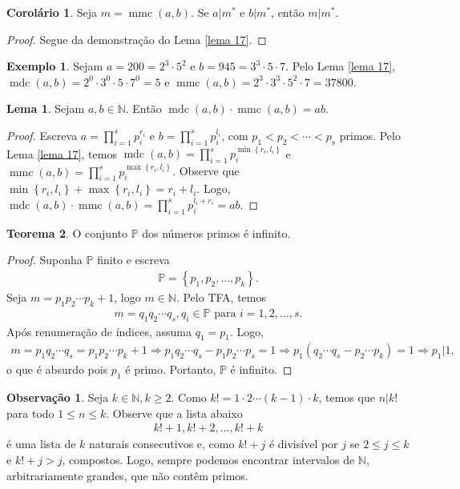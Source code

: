 \documentclass[a4paper,11pt,twoside, leqno]{article}
\DeclareMathOperator{\mdc}{mdc}
\DeclareMathOperator{\mmc}{mmc}
\theoremstyle{definition}
\newtheorem{theorem}{Teorema}[section]
\newtheorem{corollary}{Corolário}[theorem]
\newtheorem{lemma}[theorem]{Lema}
\newtheorem{remark}{Observação}[section]
\newtheorem*{example}{Exemplo}
\begin{document}
\begin{corollary}
	Seja $m = \mmc(a,b)$. Se $a|m^\ast$ e $b|m^\ast$, então $m|m^\ast$.
\end{corollary}
\begin{proof}
	Segue da demonstração do Lema \eqref{lema 17}.
\end{proof}
\begin{example}
	Sejam $a = 200 = 2^3\cdot 5^2$ e $b = 945 = 3^3\cdot 5\cdot 7$. Pelo Lema \eqref{lema 17}, $\mdc(a,b) = 2^0\cdot 3^0\cdot 5\cdot 7^0 = 5$ e $\mmc(a,b) = 2^3\cdot 3^3\cdot 5^2\cdot 7 = 37800$.
\end{example}
\begin{lemma}
	\label{lema 18}
	Sejam $a,b\in\mathbb{N}$. Então $\mdc(a,b)\cdot\mmc(a,b) = ab$.
\end{lemma}
\begin{proof}
	Escreva $a = \displaystyle{ \prod_{i=1}^{s}p_i^{r_i} }$ e $b = \displaystyle{ \prod_{i=1}^{s}p_i^{l_i} }$, com $p_1 < p_2 < \cdots < p_s$ primos. Pelo Lema \eqref{lema 17}, temos $\mdc(a,b) = \displaystyle{ \prod_{i=1}^{s}p_i^{ \min\left\{r_i,l_i\right\} } }$ e $\mmc(a,b) = \displaystyle{ \prod_{i=1}^{s}p_i^{ \max\left\{r_i,l_i\right\} } }$. Observe que $\min\left\{r_i,l_i\right\} + \max\left\{r_i,l_i\right\} = r_i+l_i$. Logo, $\mdc(a,b)\cdot\mmc(a,b) = \displaystyle{ \prod_{i=1}^{s}p_i^{l_i+r_i} } = ab$.
\end{proof}
\begin{theorem}
	O conjunto $\mathbb{P}$ dos números primos é infinito.
\end{theorem}
\begin{proof}
	Suponha $\mathbb{P}$ finito e escreva
	\begin{align*}
	\mathbb{P} = \left\{ p_1, p_2, \dots, p_k \right\}.
	\end{align*}
	Seja $m = p_1p_2\cdots p_k + 1$, logo $m\in\mathbb{N}$. Pelo TFA, temos
	\begin{align*}
	m = q_1q_2\cdots q_s, q_i\in\mathbb{P} \text{ para }i=1,2,\dots,s.
	\end{align*}
	Após renumeração de índices, assuma $q_1 = p_1$. Logo,
	\begin{align*}
	m = p_1q_2\cdots q_s = p_1p_2\cdots p_k + 1 \Rightarrow p_1q_2\cdots q_s - p_1p_2\cdots p_s = 1 \Rightarrow p_1\left( q_2\cdots q_s - p_2\cdots p_k \right) = 1 \Rightarrow p_1|1,
	\end{align*}
	o que é absurdo pois $p_1$ é primo. Portanto, $\mathbb{P}$ é infinito.
\end{proof}
\begin{remark}
	\label{obs 4}
	Seja $k\in\mathbb{N}, k\geq 2$. Como $k! = 1\cdot 2\cdots (k-1)\cdot k$, temos que $n|k!$ para todo $1\leq n\leq k$. Observe que a lista abaixo
	\begin{align*}
	k!+1, k!+2, \dots, k!+k
	\end{align*}
	é uma lista de $k$ naturais consecutivos e, como $k!+j$ é divisível por $j$ se $2\leq j\leq k$ e $k!+j > j$, compostos. Logo, sempre podemos encontrar intervalos de $\mathbb{N}$, arbitrariamente grandes, que não contêm primos.
\end{remark}
\end{document}

